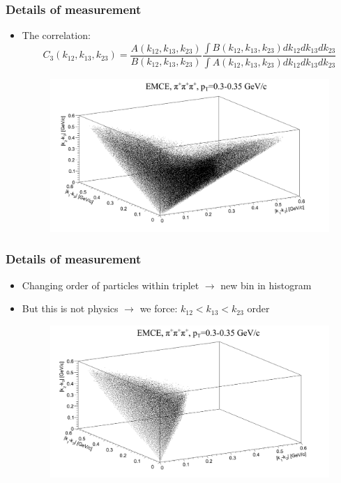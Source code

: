 \documentclass{beamer}
\begin{document}
\begin{frame}
\frametitle{Details of measurement}
\begin{itemize}
\setlength{\itemsep}{16pt}
\item The correlation:
\begin{equation}
C_3(k_{12}, k_{13}, k_{23})=\frac{A(k_{12}, k_{13}, k_{23})}{B(k_{12}, k_{13}, k_{23})}\frac{\int B(k_{12}, k_{13}, k_{23})dk_{12}dk_{13}dk_{23}}{\int A(k_{12}, k_{13}, k_{23})dk_{12}dk_{13}dk_{23}}
\end{equation}
\begin{figure}
\includegraphics[scale=0.25]{pic/C1}
\end{figure}
\end{itemize}
\end{frame}

\begin{frame}
\frametitle{Details of measurement}
\begin{itemize}
\setlength{\itemsep}{16pt}
\item Changing order of particles within triplet $\rightarrow$ new bin in histogram
\item But this is not physics $\rightarrow$ we force: $k_{12}<k_{13}<k_{23}$ order
\begin{figure}
\includegraphics[scale=0.25]{pic/C2}
\end{figure}
\end{itemize}
\end{frame}
\end{document}
